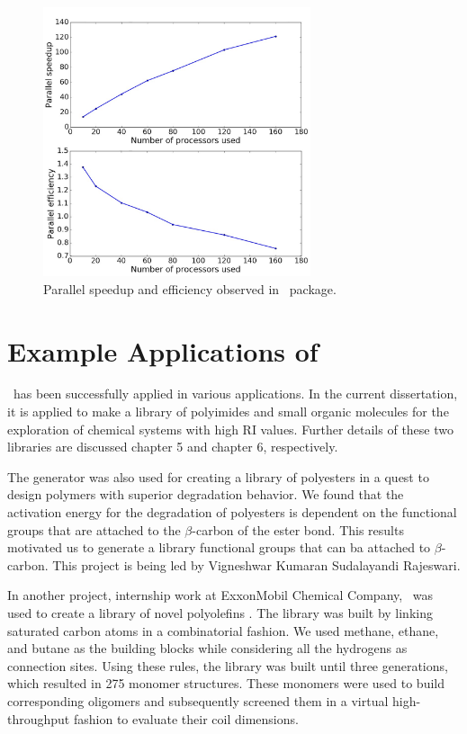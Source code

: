 \begin{figure}[htbp] 
	\centering
	\includegraphics[width=0.7\textwidth]{Chapter-4/Figures/ChemLG_performance.jpg}
	\caption{Parallel speedup and efficiency observed in \chemlg\ package.} 
	\label{fig:ChemLG_performance} 
\end{figure}  

\section{Example Applications of \chemlg}
\label{subsec:chemlg_app}

\chemlg\ has been successfully applied in various applications. In the current dissertation, it is applied to make a library of polyimides and small organic molecules for the exploration of chemical systems with high RI values. Further details of these two libraries are discussed chapter 5 and chapter 6, respectively.

The generator was also used for creating a library of polyesters in a quest to design polymers with superior degradation behavior. We found that the activation energy for the degradation of polyesters is dependent on the functional groups that are attached to the $\beta$-carbon of the ester bond. This results motivated us to generate a library functional groups that can ba attached to $\beta$-carbon. This project is being led by Vigneshwar Kumaran Sudalayandi Rajeswari. 
  
In another project, internship work at ExxonMobil Chemical Company, \chemlg\ was used to create a library of novel polyolefins \cite{Afzal2018d}. The library was built by linking saturated carbon atoms in a combinatorial fashion. We used methane, ethane, and butane as the building blocks while considering all the hydrogens as connection sites. Using these rules, the library was built until three generations, which resulted in 275 monomer structures. These monomers were used to build corresponding oligomers and subsequently screened them in a virtual high-throughput fashion to evaluate their coil dimensions.

